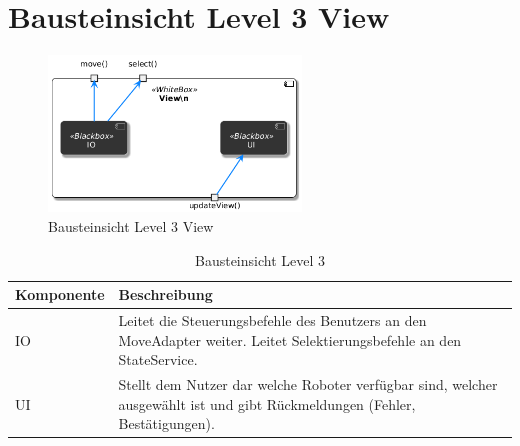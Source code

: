 \section{Bausteinsicht Level 3 View}
\begin{figure}[h] %
    \centering
    \includegraphics[width=0.6\textwidth]{diagrams/baustein_lvl_3_view.png}
    \caption{Bausteinsicht Level 3 View}
\end{figure}

\begin{table}[h!]
\centering
\begin{tabular}{|p{4cm}|p{9cm}|}
\hline
\textbf{Komponente} & \textbf{Beschreibung} \\ \hline
IO & Leitet die Steuerungsbefehle des Benutzers an den MoveAdapter weiter. Leitet Selektierungsbefehle an den StateService. \\ \hline
UI  & Stellt dem Nutzer dar welche Roboter verfügbar sind, welcher ausgewählt ist und gibt Rückmeldungen (Fehler, Bestätigungen).\\ \hline
\end{tabular}
\caption{Bausteinsicht Level 3}
\label{tab:lvl3}
\end{table}
